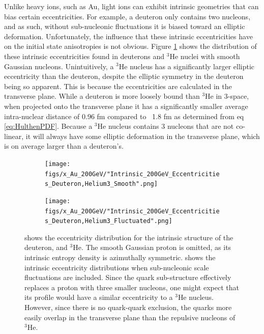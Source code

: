 \documentclass[preprint,showpacs,amsfonts,aps,prl,nofootinbib,floatfix]{revtex4}
\begin{document}
Unlike heavy ions, such as Au, light ions can exhibit intrinsic geometries that can bias certain eccentricities. For example, a deuteron only contains two nucleons, and as such, without sub-nucleonic fluctuations it is biased toward an elliptic deformation. Unfortunately, the influence that these intrinsic eccentricities have on the initial state anisotropies is not obvious. Figure \ref{fig:SmFlIntAu} shows the distribution of these intrinsic eccentricities found in deuterons and $^3$He nuclei with smooth Gaussian nucleons. Unintuitively, a $^3$He nucleus has a significantly larger elliptic eccentricity than the deuteron, despite the elliptic symmetry in the deuteron being so apparent. This is because the eccentricities are calculated in the transverse plane. While a deuteron is more loosely bound than $^3$He in 3-space, when projected onto the transverse plane it has a significantly smaller average intra-nuclear distance of 0.96 fm compared to ~1.8 fm as determined from eq \ref{eq:HulthenPDF}. Because a $^3$He nucleus contains 3 nucleons that are not co-linear, it will always have some elliptic deformation in the transverse plane, which is on average larger than a deuteron's. 
\begin{figure}
	\begin{center}
		\begin{subfigure}[t]{0.4\linewidth}
			\texttt{[image: figs/x\_Au\_200GeV/"Intrinsic\_200GeV\_Eccentricities\_Deuteron,Helium3\_Smooth".png]}
			\subcaption{\label{subfig:SmIntAu}}
		\end{subfigure}
		\begin{subfigure}[t]{0.4\linewidth}
			\texttt{[image: figs/x\_Au\_200GeV/"Intrinsic\_200GeV\_Eccentricities\_Deuteron,Helium3\_Fluctuated".png]}
			\subcaption{\label{subfig:FlIntAu}}
		\end{subfigure}
		\caption{ shows the eccentricity distribution for the intrinsic structure of the deuteron, and $^3$He. The smooth Gaussian proton is omitted, as its intrinsic entropy density is azimuthally symmetric.  shows the intrinsic eccentricity distributions when sub-nucleonic scale fluctuations are included. Since the quark sub-structure effectively replaces a proton with three smaller nucleons, one might expect that its profile would have a similar eccentricity to a $^3$He nucleus. However, since there is no quark-quark exclusion, the quarks more easily overlap in the transverse plane than the repulsive nucleons of $^3$He.}
		\label{fig:SmFlIntAu}
	\end{center}
\end{figure}
\end{document}
